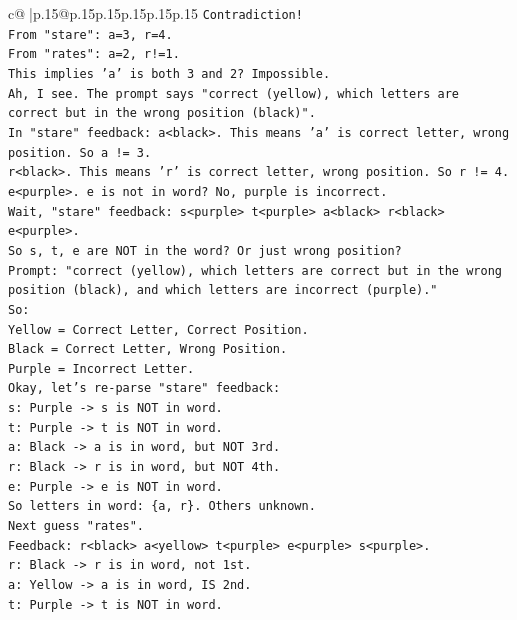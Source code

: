 \documentclass{article}
\begin{document}
{\begin{supertabular}{c@{$\;$}|p{.15\linewidth}@{}p{.15\linewidth}p{.15\linewidth}p{.15\linewidth}p{.15\linewidth}p{.15\linewidth}}
{{{\texttt{Contradiction!} \\
\texttt{From "stare": a=3, r=4.} \\
\texttt{From "rates": a=2, r!=1.} \\
\texttt{This implies 'a' is both 3 and 2? Impossible.} \\
\texttt{Ah, I see. The prompt says "correct (yellow), which letters are correct but in the wrong position (black)".} \\
\texttt{In "stare" feedback: a<black>. This means 'a' is correct letter, wrong position. So a != 3.} \\
\texttt{r<black>. This means 'r' is correct letter, wrong position. So r != 4.} \\
\texttt{e<purple>. e is not in word? No, purple is incorrect.} \\
\texttt{Wait, "stare" feedback: s<purple> t<purple> a<black> r<black> e<purple>.} \\
\texttt{So s, t, e are NOT in the word? Or just wrong position?} \\
\texttt{Prompt: "correct (yellow), which letters are correct but in the wrong position (black), and which letters are incorrect (purple)."} \\
\texttt{So:} \\
\texttt{Yellow = Correct Letter, Correct Position.} \\
\texttt{Black = Correct Letter, Wrong Position.} \\
\texttt{Purple = Incorrect Letter.} \\
\texttt{Okay, let's re{-}parse "stare" feedback:} \\
\texttt{s: Purple {-}> s is NOT in word.} \\
\texttt{t: Purple {-}> t is NOT in word.} \\
\texttt{a: Black {-}> a is in word, but NOT 3rd.} \\
\texttt{r: Black {-}> r is in word, but NOT 4th.} \\
\texttt{e: Purple {-}> e is NOT in word.} \\
\texttt{So letters in word: \{a, r\}. Others unknown.} \\
\texttt{Next guess "rates".} \\
\texttt{Feedback: r<black> a<yellow> t<purple> e<purple> s<purple>.} \\
\texttt{r: Black {-}> r is in word, not 1st.} \\
\texttt{a: Yellow {-}> a is in word, IS 2nd.} \\
\texttt{t: Purple {-}> t is NOT in word.} \\
}}}
\end{supertabular}}
\end{document}
